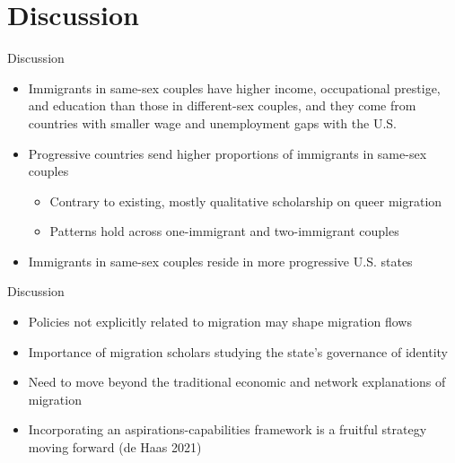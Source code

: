 \documentclass[
  ignorenonframetext,
]{beamer}
\providecommand{\tightlist}{%
  \setlength{\itemsep}{0pt}\setlength{\parskip}{0pt}}
\begin{document}
\hypertarget{discussion}{%
\section{Discussion}\label{discussion}}

\begin{frame}{Discussion}
\protect\hypertarget{discussion-1}{}
\begin{itemize}
\tightlist
\item
  Immigrants in same-sex couples have higher income, occupational
  prestige, and education than those in different-sex couples, and they
  come from countries with smaller wage and unemployment gaps with the
  U.S.
\item
  Progressive countries send higher proportions of immigrants in
  same-sex couples

  \begin{itemize}
  \tightlist
  \item
    Contrary to existing, mostly qualitative scholarship on queer
    migration
  \item
    Patterns hold across one-immigrant and two-immigrant couples
  \end{itemize}
\item
  Immigrants in same-sex couples reside in more progressive U.S. states
\end{itemize}
\end{frame}

\begin{frame}{Discussion}
\protect\hypertarget{discussion-2}{}
\begin{itemize}
\tightlist
\item
  Policies not explicitly related to migration may shape migration flows
\item
  Importance of migration scholars studying the state's governance of
  identity
\item
  Need to move beyond the traditional economic and network explanations
  of migration
\item
  Incorporating an aspirations-capabilities framework is a fruitful
  strategy moving forward (de Haas 2021)
\end{itemize}
\end{frame}
\end{document}
